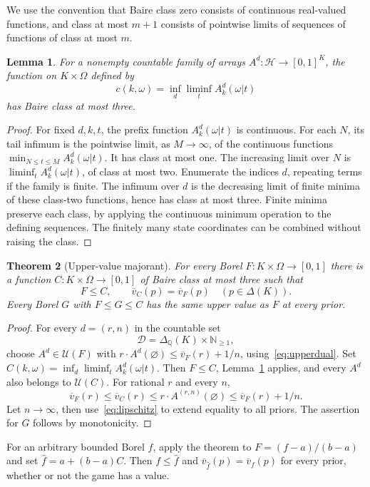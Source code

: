 \documentclass[11pt,a4paper]{article}
\newtheorem{theorem}{Theorem}[section]
\newtheorem{lemma}[theorem]{Lemma}
\theoremstyle{definition}
\theoremstyle{remark}
\newcommand{\N}{\mathbb N}
\newcommand{\HH}{\mathcal H}
\newcommand{\uv}{\overline v}
\newcommand{\UU}{\mathcal U}
\newcommand{\DD}{\mathcal D}
\begin{document}
We use the convention that Baire class zero consists of continuous
real-valued functions, and class at most $m+1$ consists of pointwise
limits of sequences of functions of class at most $m$.

\begin{lemma}\label{lem:baire}
For a nonempty countable family of arrays $A^d:\HH\to[0,1]^K$, the
function on $K\times\Omega$ defined by
\[
 c(k,\omega)=\inf_d\liminf_t A^d_k(\omega|t)
\]
has Baire class at most three.
\end{lemma}
\begin{proof}
For fixed $d,k,t$, the prefix function $A^d_k(\omega|t)$ is continuous.
For each $N$, its tail infimum is the pointwise limit, as $M\to\infty$,
of the continuous functions $\min_{N\leq t\leq M}A^d_k(\omega|t)$.
It has class at most one. The increasing limit over $N$ is
$\liminf_t A^d_k(\omega|t)$, of class at most two. Enumerate the
indices $d$, repeating terms if the family is finite. The infimum
over $d$ is the decreasing limit of finite minima of these class-two
functions, hence has class at most three. Finite minima preserve
each class, by applying the continuous minimum operation to the
defining sequences. The finitely many state coordinates can be
combined without raising the class.
\end{proof}

\begin{theorem}[Upper-value majorant]\label{thm:majorant}
For every Borel $F:K\times\Omega\to[0,1]$ there is a function
$C:K\times\Omega\to[0,1]$ of Baire class at most three such that
\[
 F\leq C,\qquad \uv_C(p)=\uv_F(p)\quad(p\in\Delta(K)).
\]
Every Borel $G$ with $F\leq G\leq C$ has the same upper value as $F$
at every prior.
\end{theorem}
\begin{proof}
For every $d=(r,n)$ in the countable set
\[
 \DD=\Delta_{\mathbb Q}(K)\times\N_{\geq1},
\]
choose $A^d\in\UU(F)$ with
$r\cdot A^d(\varnothing)\leq\uv_F(r)+1/n$, using~\eqref{eq:upperdual}.
Set $C(k,\omega)=\inf_d\liminf_tA^d_k(\omega|t)$. Then $F\leq C$,
Lemma~\ref{lem:baire} applies, and every $A^d$ also belongs to $\UU(C)$.
For rational $r$ and every $n$,
\[
 \uv_F(r)\leq\uv_C(r)
 \leq r\cdot A^{(r,n)}(\varnothing)\leq\uv_F(r)+1/n.
\]
Let $n\to\infty$, then use~\eqref{eq:lipschitz} to extend equality
to all priors. The assertion for $G$ follows by monotonicity.
\end{proof}

For an arbitrary bounded Borel $f$, apply the theorem to
$F=(f-a)/(b-a)$ and set $\widehat f=a+(b-a)C$. Then
$f\leq\widehat f$ and $\uv_{\widehat f}(p)=\uv_f(p)$ for every prior,
whether or not the game has a value.
\end{document}
